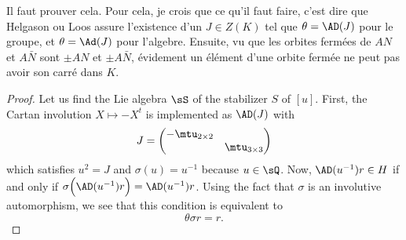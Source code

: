 \begin{probleme}
Il faut prouver cela. Pour cela, je crois que ce qu'il faut faire, c'est dire que Helgason ou Loos assure l'existence d'un $J\in Z(K)$ tel que $\theta=\AD(J)$ pour le groupe, et $\theta=\Ad(J)$ pour l'algebre. Ensuite, vu que les orbites fermées de $AN$ et $A\bar N$ sont $\pm AN$ et $\pm A\bar N$, évidement un élément d'une orbite fermée ne peut pas avoir son carré dans $K$.
\label{ProbAdJthetaj}
\end{probleme}

\begin{proof}
Let us find the Lie algebra $\sS$ of the stabilizer $S$ of $[u]$. First, the Cartan involution $X\mapsto -X^{t}$ is implemented as $\AD(J)$ with
\[
  J=\begin{pmatrix}
-\mtu_{2\times 2}\\
&\mtu_{3\times 3}
\end{pmatrix}
\]
which satisfies $u^{2}=J$ and $\sigma(u)=u^{-1}$ because $u\in\sQ$. Now, $\AD(u^{-1})r\in H$ if and only if $\sigma\Big( \AD(u^{-1})r \Big)=\AD(u^{-1})r$. Using the fact that $\sigma$ is an involutive automorphism, we see that this condition is equivalent to
\begin{equation}
\theta\sigma r=r.
\end{equation}


\end{proof}
